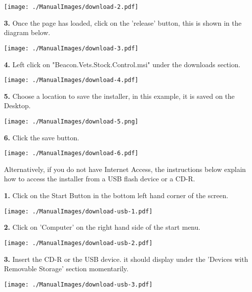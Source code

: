 \texttt{[image: ./ManualImages/download-2.pdf]}

\pagebreak

\textbf{3.} Once the page has loaded, click on the 'release' button, this is shown in the diagram below.

\texttt{[image: ./ManualImages/download-3.pdf]}

\vspace{5mm}

\textbf{4.} Left click on "Beacon.Vets.Stock.Control.msi" under the downloads section. 

\texttt{[image: ./ManualImages/download-4.pdf]}

\vspace{5mm}

\pagebreak

\textbf{5.} Choose a location to save the installer, in this example, it is saved on the Desktop.

\texttt{[image: ./ManualImages/download-5.png]}

\vspace{5mm}

\textbf{6.} Click the save button.

\texttt{[image: ./ManualImages/download-6.pdf]}

\pagebreak

\vspace{5mm}

Alternatively, if you do not have Internet Access, the instructions below explain how to access the installer from a USB flash device or a CD-R.

\textbf{1.} Click on the Start Button in the bottom left hand corner of the screen.

\texttt{[image: ./ManualImages/download-usb-1.pdf]}

\vspace{5mm}

\textbf{2.} Click on 'Computer' on the right hand side of the start menu.

\texttt{[image: ./ManualImages/download-usb-2.pdf]}

\pagebreak

\vspace{5mm}
\textbf{3.} Insert the CD-R or the USB device. it should display under the 'Devices with Removable Storage' section momentarily. 

\texttt{[image: ./ManualImages/download-usb-3.pdf]}

